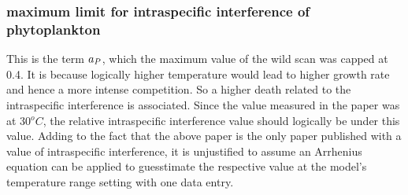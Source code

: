 \documentclass[../thesis.tex]{subfiles} %
\begin{document}
\subsubsection{maximum limit for intraspecific interference of phytoplankton}
This is the term $a_P$, which the maximum value of the wild scan was capped at 0.4.\autocite{de2007biofixation}  It is because logically higher temperature would lead to higher growth rate and hence a more intense competition.  So a higher death related to the intraspecific interference is associated.  Since the value measured in the paper was at 30$^oC$, the relative intraspecific interference value should logically be under this value.  Adding to the fact that the above paper is the only paper published with a value of intraspecific interference, it is unjustified to assume an Arrhenius equation can be applied to guesstimate the respective value at the model's temperature range setting with one data entry.
\end{document}
